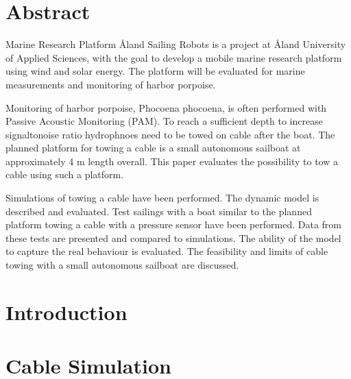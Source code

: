 \documentclass[twoside,12pt]{report} %
\begin{document}
\renewcommand{\contentsname}{Contents}	%
\renewcommand{\bibname}{Bibliography}	%


\chapter*{Abstract}

Marine Research Platform \r{A}land Sailing Robots is a project at \r{A}land University of Applied  Sciences, with the goal to develop a mobile marine research platform using wind and solar energy. The platform will be evaluated for marine measurements and monitoring of harbor porpoise.

Monitoring of harbor porpoise, Phocoena phocoena, is often performed with Passive Acoustic Monitoring (PAM). To reach a sufficient depth to increase signaltonoise ratio hydrophnoes need to be towed on cable after the boat. The planned platform for towing a cable is a small autonomous sailboat at approximately 4 m length overall. This paper evaluates the possibility to tow a cable using such a platform.
   
Simulations of towing a cable have been performed. The dynamic model is described and evaluated. Test sailings with a boat similar to the planned platform towing a cable with a pressure sensor have been performed. Data from these tests are presented and compared to simulations. The ability of the model to capture the real behaviour is evaluated. The feasibility and limits of cable towing with a small autonomous sailboat are discussed.
   

\tableofcontents  %

\chapter*{Introduction}

\chapter{Cable Simulation}

\end{document}
